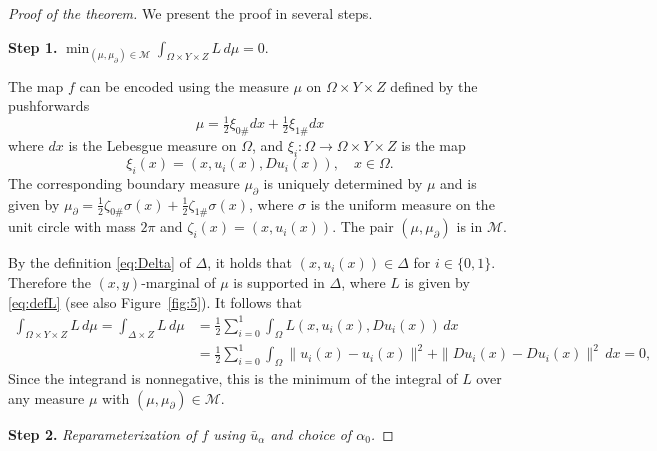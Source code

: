 \documentclass{article}
\theoremstyle{definition}
\theoremstyle{remark}
\newcommand{\uu}{u}
\begin{document}
%


%



%
%
%
%
\begin{proof}[Proof of the theorem]
We present the proof in several steps.

\noindent\textbf{Step 1.} $\displaystyle\min_{(\mu,\mu_\partial)\in \mathcal M}\int_{\Omega\times Y\times Z}L\,d\mu=0.$

The map $f$ can be encoded using the measure $\mu$ on $\Omega\times Y\times Z$ defined by  the pushforwards
\[\mu=\tfrac12\xi_{0\#}dx+\tfrac12\xi_{1\#}dx\]
where $dx$ is 
{the} Lebesgue measure on $\Omega$, and $\xi_i\colon\Omega\to\Omega\times Y\times Z$ is the map
\[\xi_i(x)=(x,\uu_i(x),D\uu_i(x)),\quad x\in \Omega.\]
The corresponding boundary measure $\mu_\partial$ is uniquely determined by $\mu$ and is given by $\mu_\partial=\frac12\zeta_{0\#}\sigma(x)+\frac12\zeta_{1\#}\sigma(x)$, where $\sigma$ is the uniform measure on the unit circle with mass $2\pi$ and $\zeta_i(x)=(x,u_i(x))$. The pair $(\mu,\mu_\partial)$ is in $\mathcal M$.


By the definition \eqref{eq:Delta} of $\Delta$, it holds that $(x,\uu_i(x)) \in \Delta$ for $i \in \{0,1\}$. Therefore the $(x,y)$-marginal of $\mu$ is supported in $\Delta$, where $L$ is given by \eqref{eq:defL} (see also Figure~\ref{fig:5}).
It follows that
\begin{align*}
    \int_{\Omega\times Y\times Z} L\,d\mu = \int_{\Delta \times Z} L\,d\mu 
    &=\frac12\sum_{i=0}^1\int_{\Omega}L(x,\uu_i(x),D\uu_i(x))\,dx\\
    &=\frac12\sum_{i=0}^1 \int_{\Omega}\|\uu_i(x)-\uu_i(x)\|^2+\|D\uu_i(x)-D\uu_i(x)\|^2\,dx=0,
\end{align*}
Since the integrand is nonnegative, this is  the minimum of the integral of $L$ over any measure $\mu$ with $(\mu,\mu_\partial)\in\mathcal M$.


%

\noindent\textbf{Step 2.} \emph{Reparameterization of $f$ using $\bar \uu_\alpha$ and choice of $\alpha_0$.} 



%




\end{proof}
\end{document}

